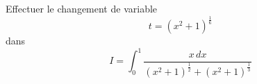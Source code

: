 Effectuer le changement de variable 
\begin{displaymath}
 t = (x^2+1)^{\frac{1}{6}}
\end{displaymath}
dans
\begin{displaymath}
 I = \int_0^1\frac{x\,dx}{(x^2+1)^{\frac{1}{2}}+(x^2+1)^{\frac{1}{3}}}
\end{displaymath}
\bigskip \bigskip